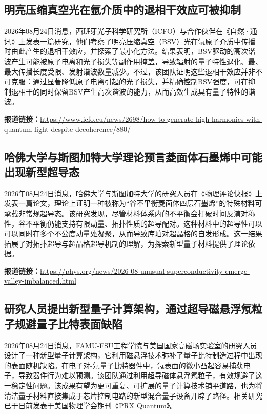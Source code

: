 \documentclass[12pt,a4paper]{ctexart}
\begin{document}
\subsection{ 明亮压缩真空光在氩介质中的退相干效应可被抑制 }

2026年08月24日消息，西班牙光子科学研究所（ICFO）与合作伙伴在《自然·通讯》上发表一篇研究，他们考察了明亮压缩真空（BSV）光在氩原子介质中传播时由此产生的退相干效应，并探索了最小化方法。结果表明，BSV驱动的高次谐波产生可能被原子电离和光子损失等副作用掩盖，导致辐射的量子特性退化、最、最大传播长度受限、发射谐波数量减少。不过，该团队证明这些退相干效应并非不可克服：通过显著降低原子电离引起的光子损失，并精确控制BSV强度，可在抑制退相干的同时保留BSV产生高次谐波的能力，从而高效生成具有量子特性的谐波。

\noindent\textbf{报道链接：}\url{https://www.icfo.eu/news/2698/how-to-generate-high-harmonics-with-quantum-light-despite-decoherence/880/}

\subsection{ 哈佛大学与斯图加特大学理论预言菱面体石墨烯中可能出现新型超导态 }

2026年08月24日消息，哈佛大学与斯图加特大学的研究人员在《物理评论快报》上发表一篇论文，理论上证明一种被称为“谷不平衡菱面体四层石墨烯”的特殊材料可承载非常规超导态。该研究发现，尽管材料体系内的不平衡会打破时间反演对称性，谷不平衡仍能支持有限动量、拓扑性质的超导配对。这种材料中的超导性可以可以同时在多个不公度动量处凝聚，从而导致库珀对超晶格的自发形成。这一结果拓展了对拓扑超导与超晶格超导机制的理解，为探索新型量子材料提供了理论依据。

\noindent\textbf{报道链接：}\url{https://phys.org/news/2026-08-unusual-superconductivity-emerge-valley-imbalanced.html}

\subsection{ 研究人员提出新型量子计算架构，通过超导磁悬浮氖粒子规避量子比特表面缺陷 }

2026年08月24日消息，FAMU-FSU工程学院与美国国家高磁场实验室的研究人员设计了一种新型量子计算架构，它利用磁悬浮技术弥补了量子比特制造过程中出现的表面随机缺陷。在电子对-氖量子比特器件中，氖表面的微小凸起容易捕获电子，导致器件行为难以预测。该团队通过利用超导磁体悬浮氖粒子，有效规避了这一稳定性问题。该成果有望为更可重复、可扩展的量子计算技术铺平道路，也为将清洁量子材料直接集成于芯片控制电路的新型混合量子设备开辟了路径。相关研究已于日前发表于美国物理学会期刊《PRX Quantum》。
\end{document}
